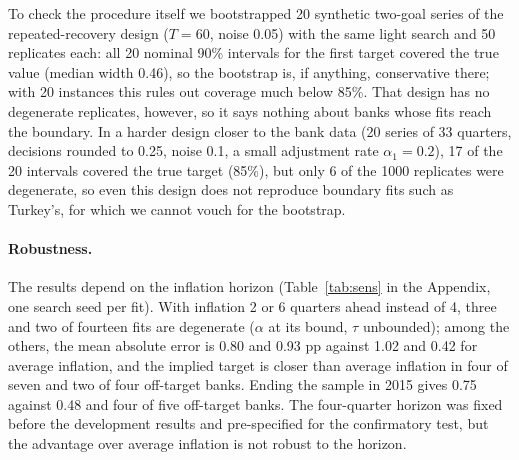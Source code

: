\documentclass[11pt,a4paper]{article}
\theoremstyle{remark}\newtheorem{remark}{Remark}
\begin{document}
To check the procedure itself we bootstrapped 20 synthetic two-goal series of the repeated-recovery design ($T=60$, noise 0.05) with the same light search and 50 replicates each: all 20 nominal 90\% intervals for the first target covered the true value (median width 0.46), so the bootstrap is, if anything, conservative there; with 20 instances this rules out coverage much below 85\%. That design has no degenerate replicates, however, so it says nothing about banks whose fits reach the boundary. In a harder design closer to the bank data (20 series of 33 quarters, decisions rounded to 0.25, noise 0.1, a small adjustment rate $\alpha_1=0.2$), 17 of the 20 intervals covered the true target (85\%), but only 6 of the 1000 replicates were degenerate, so even this design does not reproduce boundary fits such as Turkey's, for which we cannot vouch for the bootstrap.
\begin{table}[t]\centering\small
\caption{Moving-block bootstrap of the implied inflation target (200 replicates, blocks of 8 quarters, lighter search). $\hat\tau$ (full): reported estimate; $\hat\tau$ (light): estimate of the lighter search used in the replicates. Quantiles over all replicates; replicates with $\alpha$ at its lower bound ($\tau$ unbounded) are placed at $\pm\infty$, and an end they reach is shown as unbounded.}\label{tab:boot}\end{table}


\paragraph{Robustness.} The results depend on the inflation horizon (Table~\ref{tab:sens} in the Appendix, one search seed per fit). With inflation 2 or 6 quarters ahead instead of 4, three and two of fourteen fits are degenerate ($\alpha$ at its bound, $\tau$ unbounded); among the others, the mean absolute error is 0.80 and 0.93 pp against 1.02 and 0.42 for average inflation, and the implied target is closer than average inflation in four of seven and two of four off-target banks. Ending the sample in 2015 gives 0.75 against 0.48 and four of five off-target banks. The four-quarter horizon was fixed before the development results and pre-specified for the confirmatory test, but the advantage over average inflation is not robust to the horizon.
\end{document}
